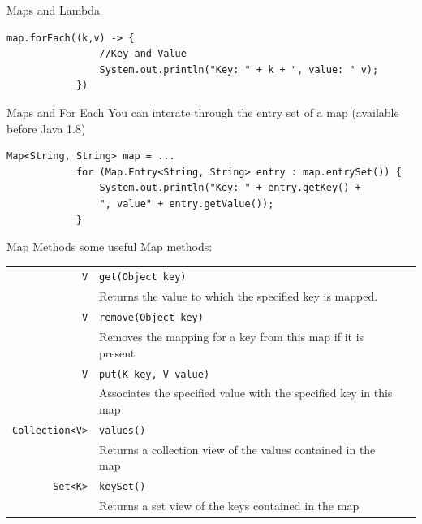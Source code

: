 	\begin{frame}[fragile]{Maps and Lambda}
		\begin{lstlisting}[basicstyle=\ttfamily\scriptsize]
			map.forEach((k,v) -> {
				//Key and Value
				System.out.println("Key: " + k + ", value: " v);
			})
		\end{lstlisting}
	\end{frame}
	
	\begin{frame}[fragile]{Maps and For Each}
		You can interate through the entry set of a map (available before Java 1.8)
		\begin{lstlisting}[basicstyle=\ttfamily\scriptsize]
			Map<String, String> map = ...
			for (Map.Entry<String, String> entry : map.entrySet()) {
				System.out.println("Key: " + entry.getKey() +
				", value" + entry.getValue());
			}
		\end{lstlisting}
	\end{frame}
	
		\begin{frame}[fragile]{Map Methods}
		some useful Map methods:\\
		\vspace{1em}
		\begin{tabular}{ r l l }
			\texttt{V} & \texttt{get(Object key)}
			& \\
			& \footnotesize{Returns the value to which the specified key is mapped.} \\
			\texttt{V} & \texttt{remove(Object key)}
			& \\
			& \footnotesize{Removes the mapping for a key from this map if it is present} \\
			\texttt{V} &\texttt{put(K key, V value)}
			& \\
			& \footnotesize{Associates the specified value with the specified key in this map} \\
			\texttt{Collection<V>} &\texttt{values()}
			& \\
			& \footnotesize{Returns a collection view of the values contained in the map} \\
			\texttt{Set<K>} &\texttt{keySet()}
			& \\
			& \footnotesize{Returns a set view of the keys contained in the map} \\
		\end{tabular}
		
	\end{frame}
	
